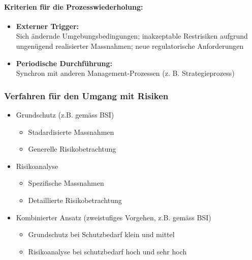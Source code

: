 \documentclass[10pt,a4paper]{article}
\begin{document}
\paragraph*{Kriterien für die Prozesswiederholung:}
\begin{itemize}[noitemsep,topsep=0pt,leftmargin=*]
    \item \textbf{Externer Trigger:}\\Sich ändernde
    Umgebungsbedingungen; inakzeptable Restrisiken aufgrund ungenügend realisierter Massnahmen; neue regulatorische Anforderungen
    \item \textbf{Periodische Durchführung:}\\Synchron mit anderen Management-Prozessen (z. B. Strategieprozess)
\end{itemize}

\subsubsection*{Verfahren für den Umgang mit Risiken}
\begin{itemize}[noitemsep,topsep=0pt,leftmargin=*]
    \item Grundschutz (z.B. gemäss BSI)
    \begin{itemize}[noitemsep,topsep=0pt,leftmargin=*]
        \item Stadardisierte Massnahmen
        \item Generelle Risikobetrachtung
    \end{itemize}
    \item Risikoanalyse
    \begin{itemize}[noitemsep,topsep=0pt,leftmargin=*]
        \item Spezifische Massnahmen
        \item Detaillierte Risikobetrachtung
    \end{itemize}
    \item Kombinierter Ansatz (zweistufiges Vorgehen, z.B. gemäss BSI)
    \begin{itemize}[noitemsep,topsep=0pt,leftmargin=*]
        \item Grundschutz bei Schutzbedarf klein und mittel
        \item Risikoanalyse bei schutzbedarf hoch und sehr hoch
    \end{itemize}
\end{itemize}
\end{document}
